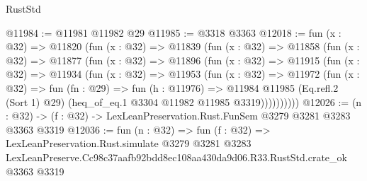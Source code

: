 \begin{lexlean}{RustStd}
\begin{coremodule}
@11984 := @11981 @11982 @29
@11985 := @3318 @3363
@12018 := fun (x : @32) =>
  @11820
    (fun (x : @32) =>
    @11839
      (fun (x : @32) =>
      @11858
        (fun (x : @32) =>
        @11877
          (fun (x : @32) =>
          @11896
            (fun (x : @32) =>
            @11915
              (fun (x : @32) =>
              @11934
                (fun (x : @32) =>
                @11953
                  (fun (x : @32) =>
                  @11972
                    (fun (x : @32) =>
                    fun (fn : @29) =>
                    fun (h : @11976) =>
                    @11984
                      @11985
                      (Eq.refl.{2} (Sort 1) @29)
                      (heq_of_eq.{1} @3304 @11982 @11985 @3319))))))))))
@12026 := (n : @32) -> (f : @32) -> LexLeanPreservation.Rust.FunSem @3279 @3281 @3283 @3363 @3319
@12036 := fun (n : @32) =>
  fun (f : @32) =>
  LexLeanPreservation.Rust.simulate
    @3279
    @3281
    @3283
    LexLeanPreserve.Cc98c37aafb92bdd8ec108aa430da9d06.R33.RustStd.crate_ok
    @3363
    @3319
\end{coremodule}
\end{lexlean}
